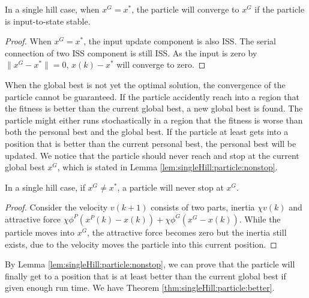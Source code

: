 \begin{mylem}
\label{lem:singleHill:particle:converge}
In a single hill case, when $ x^{G} = x^{*} $, the particle will converge to $ x^{G} $ if the particle is input-to-state stable.
\begin{proof}
When $ x^{G} = x^{*} $, the input update component is also ISS.
The serial connection of two ISS component is still ISS.
As the input is zero by $ \lVert x^{G} - x^{*} \rVert = 0 $, $ x(k) - x^{*} $ will converge to zero.
\end{proof}
\end{mylem}

When the global best is not yet the optimal solution, the convergence of the particle cannot be guaranteed.
If the particle accidently reach into a region that the fitness is better than the current global best, a new global best is found.
The particle might either runs stochastically in a region that the fitness is worse than both the personal best and the global best.
If the particle at least gets into a position that is better than the current personal best, the personal best will be updated. 
We notice that the particle should never reach and stop at the current global best $ x^{G} $, which is stated in Lemma \ref{lem:singleHill:particle:nonstop}.

\begin{mylem}
\label{lem:singleHill:particle:nonstop}
In a single hill case, if $ x^{G} \not = x^{*} $, a particle will never stop at $ x^{G} $. 
\begin{proof}
Consider the velocity $ v(k+1) $ consists of two parts, inertia $ \chi v(k) $ and attractive force $ \chi \phi^{P} (x^{P}(k) - x(k) ) + \chi \phi^{G} ( x^{G} - x(k) ) $.
While the particle moves into $ x^{G} $, the attractive force becomes zero but the inertia still exists, due to the velocity moves the particle into this current position.
\end{proof} 
\end{mylem}

By Lemma \ref{lem:singleHill:particle:nonstop}, we can prove that the particle will finally get to a position that is at least better than the current global best if given enough run time.
We have Theorem \ref{thm:singleHill:particle:better}.

